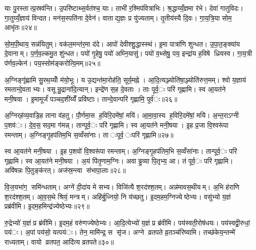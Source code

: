 
याः पु॒रस्तात्प्र॒स्रव॑न्ति। उ॒परि॑ष्टाथ्स॒र्वत॑श्च॒ याः। ताभी॑ र॒श्मिप॑वित्राभिः। श्र॒द्धाय्यँ॒ज्ञमा र॑भे। देवा॑ गातुविदः। गा॒तुय्यँ॒ज्ञाय॑ विन्दत। मन॑स॒स्पति॑ना दे॒वेन॑। वाताद्य॒ज्ञः प्र यु॑ज्यताम्। तृ॒तीय॑स्यै दि॒वः। गा॒य॒त्रि॒या सोम॒ आभृ॑तः॥२४॥

सो॒म॒पी॒थाय॒ सन्न॑यितुम्। वक॑ल॒मन्त॑र॒मा द॑दे। आपो॑ देवीश्शु॒द्धास्स्थ॑। इ॒मा पात्रा॑णि शुन्धत। उ॒पा॒त॒ङ्क्या॑य दे॒वानाम्। प॒र्ण॒व॒ल्कमु॒त शु॑न्धत। पयो॑ गृ॒हेषु॒ पयो॑ अघ्नि॒यासु॑। पयो॑ व॒थ्सेषु॒ पय॒ इन्द्रा॑य ह॒विषे ध्रियस्व। गा॒य॒त्री प॑र्णव॒ल्केन॑। पय॒स्सोम॑ङ्करोत्वि॒मम्॥२५॥

अ॒ग्निङ्गृ॑ह्णामि सु॒रथ॒य्योँ म॑यो॒भूः। य उ॒द्यन्त॑मा॒रोह॑ति॒ सूर्य॒मह्ने। आ॒दि॒त्यञ्ज्योति॑षा॒ञ्ज्योति॑रुत्त॒मम्। श्वो य॒ज्ञाय॑ रमतान्दे॒वताभ्यः। वसून्रु॒द्राना॑दि॒त्यान्। इन्द्रे॑ण स॒ह दे॒वताः। ताः पूर्व॒ः परि॑ गृह्णामि। स्व आ॒यत॑ने मनी॒षया। इ॒मामूर्जं॑ पञ्चद॒शींय्येँ प्रवि॑ष्टाः। तान्दे॒वान्परि॑ गृह्णामि॒ पूर्व॑ः॥२६॥

अ॒ग्निर्‌ह॑व्य॒वाडि॒ह ताना व॑हतु। पौ॒र्णमा॒स ह॒विरि॒दमे॑षां॒ मयि॑। आ॒मा॒वा॒स्य ह॒विरि॒दमे॑षां॒ मयि॑। अ॒न्त॒राऽग्नी प॒शव॑ः। दे॒व॒स॒सद॒मा ग॑मन्न्। तान्पूर्व॒ः परि॑ गृह्णामि। स्व आ॒यत॑ने मनी॒षया। इ॒ह प्र॒जा वि॒श्वरू॑पा रमन्ताम्। अ॒ग्निङ्गृ॒हप॑तिम॒भि स॒व्वँसा॑नाः। ता ःपूर्व॒ ःपरि॑ गृह्णामि॥२७॥

स्व आ॒यत॑ने मनी॒षया। इ॒ह प॒शवो॑ वि॒श्वरू॑पा रमन्ताम्। अ॒ग्निङ्गृ॒हप॑तिम॒भि स॒व्वँसा॑नाः। तान्पूर्व॒ः परि॑ गृह्णामि। स्व आ॒यत॑ने मनी॒षया। अ॒यं पि॑तृ॒णाम॒ग्निः। अवाड्ढ॒व्या पि॒तृभ्य॒ आ। तं पूर्व॒ः परि॑ गृह्णामि। अवि॑षन्नः पि॒तुङ्क॑रत्। अज॑स्र॒न्त्वा स॑भापा॒लाः॥२८॥

वि॒ज॒यभा॑ग॒ समि॑न्धताम्। अग्ने॑ दी॒दा॑य मे सभ्य। विजि॑त्यै श॒रद॑श्श॒तम्। अन्न॑मावस॒थीयम्। अ॒भि ह॑राणि श॒रद॑श्श॒तम्। आ॒व॒स॒थे श्रियं॒ मन्त्रम्। अहि॑र्बु॒ध्नियो॒ नि य॑च्छतु। इ॒दम॒हम॒ग्निज्येष्ठेभ्यः। वसु॑भ्यो य॒ज्ञं प्रब्र॑वीमि। इ॒दम॒हमिन्द्र॑ज्येष्ठेभ्यः॥२९॥

रु॒द्रेभ्यो॑ य॒ज्ञं प्र ब्र॑वीमि। इ॒दम॒हं वरु॑णज्येष्ठेभ्यः। आ॒दि॒त्येभ्यो॑ य॒ज्ञं प्र ब्र॑वीमि। पय॑स्वती॒रोष॑धयः। पय॑स्वद्वी॒रुधां॒ पय॑ः। अ॒पां पय॑सो॒ यत्पय॑ः। तेन॒ मामि॑न्द्र॒ स सृ॑ज। अग्ने व्रतपते व्र॒तञ्च॑रिष्यामि। तच्छ॑केय॒न्तन्मे॑ राध्यताम्। वायो व्रतपत॒ आदि॑त्य व्रतपते॥३०॥

